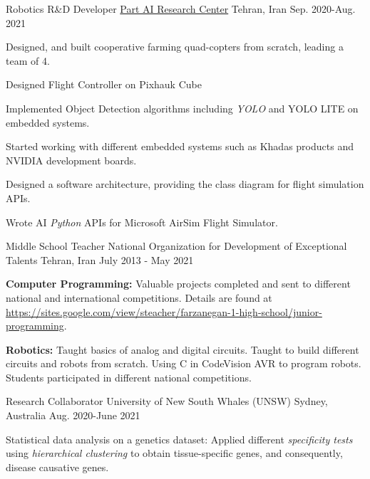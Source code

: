 \begin{cventries}
  \cventry
{Robotics R\&D Developer}  %
    {\href{https://ir.linkedin.com/company/partdp-ai}{Part AI Research Center}} %
    {Tehran, Iran} %
    {Sep. 2020-Aug. 2021} %
    {
      \begin{cvitems} %
            \item {Designed, and built cooperative farming quad-copters from scratch, leading a team of 4.}
            \item {Designed Flight Controller on Pixhauk Cube}
            \item {Implemented Object Detection algorithms including \textit{YOLO} and YOLO LITE on embedded systems.}
            \item {Started working with different embedded systems such as Khadas products and NVIDIA development boards.}
        \item {Designed a software architecture, providing the class diagram for flight simulation APIs.}
            \item {Wrote AI \textit{Python} APIs for Microsoft AirSim Flight Simulator.}
      \end{cvitems}
    } 
\cventry
    {Middle School Teacher}
    {National Organization for Development of Exceptional Talents}
    {Tehran, Iran}
    {July 2013 -  May 2021}
    {
      \begin{cvitems} %
        \item{\textbf{Computer Programming:}}
          {Valuable projects completed and sent to different national and international competitions. Details are found at \href{https://sites.google.com/view/steacher/farzanegan-1-high-school/junior-programming}{https://sites.google.com/view/steacher/farzanegan-1-high-school/junior-programming}.}
        \item{\textbf{Robotics:}}
          {Taught basics of analog and digital circuits. Taught to build different circuits and robots from scratch. Using C in CodeVision AVR to program robots. Students participated in different national competitions.}
      \end{cvitems}
    }
    
  \cventry
{Research Collaborator}  %
    {University of New South Whales (UNSW)} %
    {Sydney, Australia} %
    {Aug. 2020-June 2021} %
    {
      \begin{cvitems} %
        \item{Statistical data analysis on a genetics dataset: Applied different \textit{specificity tests} using \textit{hierarchical clustering} to obtain tissue-specific genes, and consequently, disease causative genes.}
      \end{cvitems}
    }


\end{cventries}
